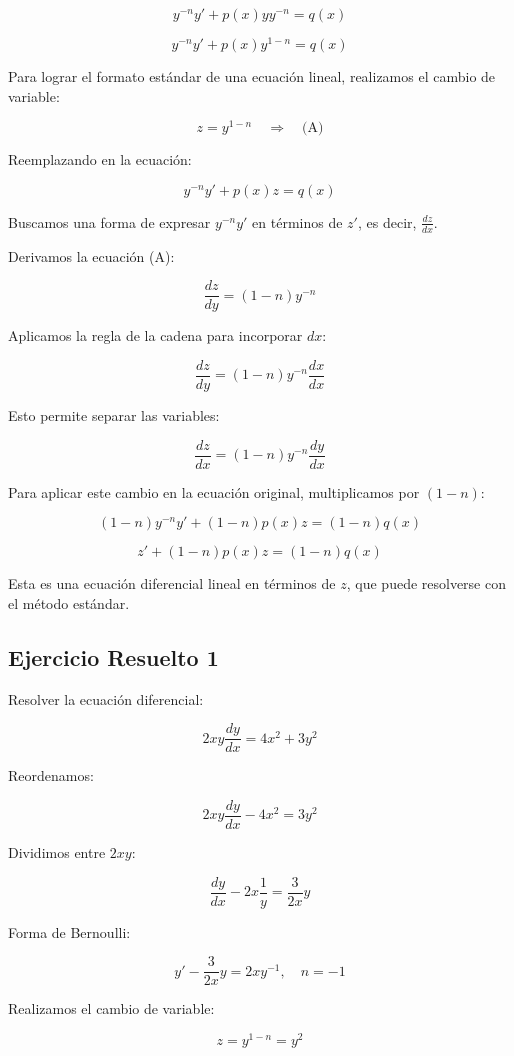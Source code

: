 \[
y^{-n} y' + p(x) y y^{-n} = q(x)
\]

\[
y^{-n} y' + p(x) y^{1-n} = q(x)
\]

Para lograr el formato estándar de una ecuación lineal, realizamos el cambio de variable:

\[
z = y^{1-n} \quad \Rightarrow \quad \text{(A)}
\]

Reemplazando en la ecuación:

\[
y^{-n} y' + p(x) z = q(x)
\]

Buscamos una forma de expresar \( y^{-n} y' \) en términos de \( z' \), es decir, \( \frac{dz}{dx} \).

Derivamos la ecuación (A):

\[
\frac{dz}{dy} = (1 - n) y^{-n}
\]

Aplicamos la regla de la cadena para incorporar \( dx \):

\[
\frac{dz}{dy} = (1 - n) y^{-n} \frac{dx}{dx}
\]

Esto permite separar las variables:

\[
\frac{dz}{dx} = (1 - n) y^{-n} \frac{dy}{dx}
\]

Para aplicar este cambio en la ecuación original, multiplicamos por \( (1 - n) \):

\[
(1 - n) y^{-n} y' + (1 - n) p(x) z = (1 - n) q(x)
\]

\[
z' + (1 - n) p(x) z = (1 - n) q(x)
\]

Esta es una ecuación diferencial lineal en términos de \( z \), que puede resolverse con el método estándar.



\subsection{Ejercicio Resuelto 1}


Resolver la ecuación diferencial:

\[
2xy \frac{dy}{dx} = 4x^2 + 3y^2
\]

Reordenamos:

\[
2xy \frac{dy}{dx} - 4x^2 = 3y^2
\]

Dividimos entre \( 2xy \):

\[
\frac{dy}{dx} - 2x \frac{1}{y} = \frac{3}{2x} y
\]

Forma de Bernoulli:

\[
y' - \frac{3}{2x} y = 2x y^{-1}, \quad n = -1
\]

Realizamos el cambio de variable:

\[
z = y^{1-n} = y^2
\]

